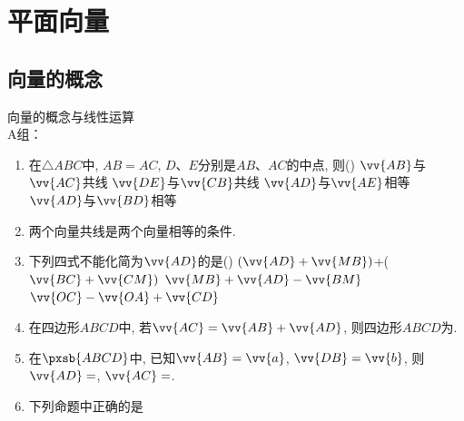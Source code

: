 \chapter{平面向量}

\section{向量的概念}
\zsd 向量的概念与线性运算 \\
A组：
\begin{enumerate}
    \item 在$\triangle{ABC}$中, $AB=AC$, $D$、$E$分别是$AB$、$AC$的中点, 则\dotfill()
    \xx
    {$\vv{AB}$与$\vv{AC}$共线}
    {$\vv{DE}$与$\vv{CB}$共线}
    {$\vv{AD}$与$\vv{AE}$相等}
    {$\vv{AD}$与$\vv{BD}$相等}
    \item 两个向量共线是两个向量相等的条件.
    \item 下列四式不能化简为$\vv{AD}$的是\dotfill()
    {$(\vv{AD}+\vv{MB})$+($\vv{BC}+\vv{CM})$}
    {$\vv{MB}+\vv{AD}-\vv{BM}$}
    {$\vv{OC}-\vv{OA}+\vv{CD}$}
    \item 在四边形$ABCD$中, 若$\vv{AC}=\vv{AB}+\vv{AD}$, 则四边形$ABCD$为. 
    \item 在$\pxsb{ABCD}$中, 已知$\vv{AB}=\vv{a}$, $\vv{DB}=\vv{b}$, 则$\vv{AD}=$, $\vv{AC}=$.
    \item 下列命题中正确的是
    \begin{jieda}
    \end{jieda}
\end{enumerate}
